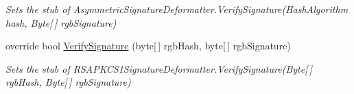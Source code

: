 \begin{DoxyCompactItemize}
\begin{DoxyCompactList}\small\item\em Sets the stub of Asymmetric\-Signature\-Deformatter.\-Verify\-Signature(\-Hash\-Algorithm hash, Byte\mbox{[}$\,$\mbox{]} rgb\-Signature)\end{DoxyCompactList}\item 
override bool \hyperlink{class_system_1_1_security_1_1_cryptography_1_1_fakes_1_1_stub_r_s_a_p_k_c_s1_signature_deformatter_ab513392a95be1657a0187175e599bf95}{Verify\-Signature} (byte\mbox{[}$\,$\mbox{]} rgb\-Hash, byte\mbox{[}$\,$\mbox{]} rgb\-Signature)
\begin{DoxyCompactList}\small\item\em Sets the stub of R\-S\-A\-P\-K\-C\-S1\-Signature\-Deformatter.\-Verify\-Signature(\-Byte\mbox{[}$\,$\mbox{]} rgb\-Hash, Byte\mbox{[}$\,$\mbox{]} rgb\-Signature)\end{DoxyCompactList}\end{DoxyCompactItemize}
